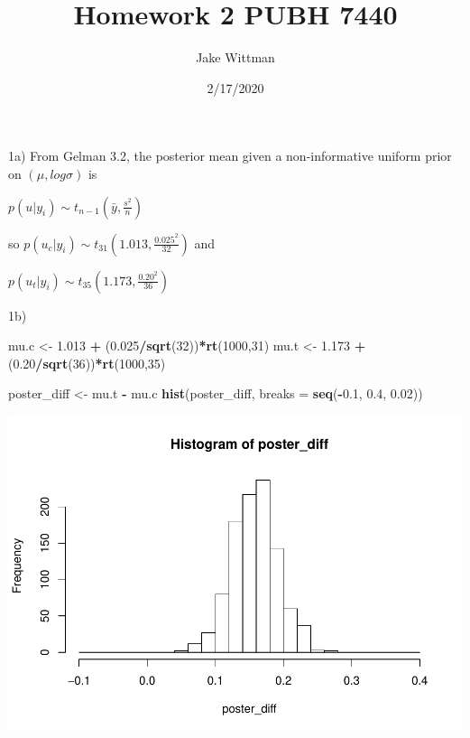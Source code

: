 \documentclass[
]{article}
\title{Homework 2 PUBH 7440}
\author{Jake Wittman}
\date{2/17/2020}
\newenvironment{Shaded}{\begin{snugshade}}{\end{snugshade}}
\newcommand{\DataTypeTok}[1]{\textcolor[rgb]{0.13,0.29,0.53}{#1}}
\newcommand{\DecValTok}[1]{\textcolor[rgb]{0.00,0.00,0.81}{#1}}
\newcommand{\FloatTok}[1]{\textcolor[rgb]{0.00,0.00,0.81}{#1}}
\newcommand{\KeywordTok}[1]{\textcolor[rgb]{0.13,0.29,0.53}{\textbf{#1}}}
\newcommand{\NormalTok}[1]{#1}
\newcommand{\OperatorTok}[1]{\textcolor[rgb]{0.81,0.36,0.00}{\textbf{#1}}}
\newcommand{\StringTok}[1]{\textcolor[rgb]{0.31,0.60,0.02}{#1}}
\begin{document}
\maketitle

1a) From Gelman 3.2, the posterior mean given a non-informative uniform
prior on \((\mu, log \sigma)\) is

\(p(u|y_i) \sim t_{n-1}(\bar{y}, \frac{s^2}{n})\)

so \(p(u_c | y_i) \sim t_{31}(1.013, \frac{0.025^2}{32})\) and

\(p(u_t | y_i) \sim t_{35}(1.173, \frac{0.20^2}{36})\)

1b)

\begin{Shaded}
\begin{Highlighting}[]
\NormalTok{mu.c <-}\StringTok{ }\FloatTok{1.013} \OperatorTok{+}\StringTok{ }\NormalTok{(}\FloatTok{0.025}\OperatorTok{/}\KeywordTok{sqrt}\NormalTok{(}\DecValTok{32}\NormalTok{))}\OperatorTok{*}\KeywordTok{rt}\NormalTok{(}\DecValTok{1000}\NormalTok{,}\DecValTok{31}\NormalTok{)}
\NormalTok{mu.t <-}\StringTok{ }\FloatTok{1.173} \OperatorTok{+}\StringTok{ }\NormalTok{(}\FloatTok{0.20}\OperatorTok{/}\KeywordTok{sqrt}\NormalTok{(}\DecValTok{36}\NormalTok{))}\OperatorTok{*}\KeywordTok{rt}\NormalTok{(}\DecValTok{1000}\NormalTok{,}\DecValTok{35}\NormalTok{)}

\NormalTok{poster_diff <-}\StringTok{ }\NormalTok{mu.t }\OperatorTok{-}\StringTok{ }\NormalTok{mu.c}
\KeywordTok{hist}\NormalTok{(poster_diff, }\DataTypeTok{breaks =} \KeywordTok{seq}\NormalTok{(}\OperatorTok{-}\FloatTok{0.1}\NormalTok{, }\FloatTok{0.4}\NormalTok{, }\FloatTok{0.02}\NormalTok{))}
\end{Highlighting}
\end{Shaded}

\includegraphics{hw2_files/figure-latex/unnamed-chunk-1-1.pdf}
\end{document}
